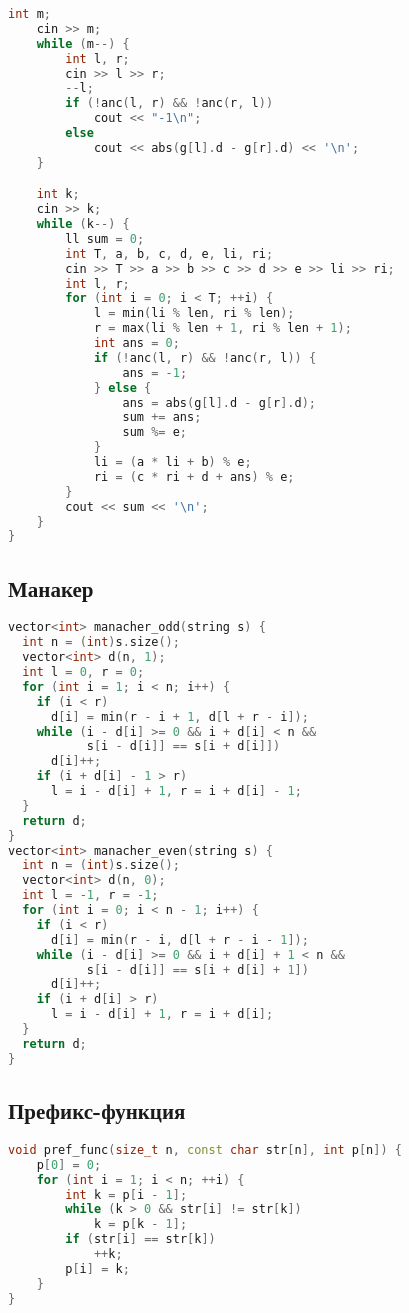 \documentclass[10pt,a4paper,landscape,twosided]{extarticle}
\begin{document}
\begin{multicols}{3}
\begin{lstlisting}[language=C++]
    int m;
    cin >> m;
    while (m--) {
        int l, r;
        cin >> l >> r;
        --l;
        if (!anc(l, r) && !anc(r, l))
            cout << "-1\n";
        else
            cout << abs(g[l].d - g[r].d) << '\n';
    }

    int k;
    cin >> k;
    while (k--) {
        ll sum = 0;
        int T, a, b, c, d, e, li, ri;
        cin >> T >> a >> b >> c >> d >> e >> li >> ri;
        int l, r;
        for (int i = 0; i < T; ++i) {
            l = min(li % len, ri % len);
            r = max(li % len + 1, ri % len + 1);
            int ans = 0;
            if (!anc(l, r) && !anc(r, l)) {
                ans = -1;
            } else {
                ans = abs(g[l].d - g[r].d);
                sum += ans;
                sum %= e;
            }
            li = (a * li + b) % e;
            ri = (c * ri + d + ans) % e;
        }
        cout << sum << '\n';
    }
}
\end{lstlisting}

\subsection{Манакер}
\begin{lstlisting}[language=C++]
vector<int> manacher_odd(string s) {
  int n = (int)s.size();
  vector<int> d(n, 1);
  int l = 0, r = 0;
  for (int i = 1; i < n; i++) {
    if (i < r)
      d[i] = min(r - i + 1, d[l + r - i]);
    while (i - d[i] >= 0 && i + d[i] < n &&
           s[i - d[i]] == s[i + d[i]])
      d[i]++;
    if (i + d[i] - 1 > r)
      l = i - d[i] + 1, r = i + d[i] - 1;
  }
  return d;
}
vector<int> manacher_even(string s) {
  int n = (int)s.size();
  vector<int> d(n, 0);
  int l = -1, r = -1;
  for (int i = 0; i < n - 1; i++) {
    if (i < r)
      d[i] = min(r - i, d[l + r - i - 1]);
    while (i - d[i] >= 0 && i + d[i] + 1 < n &&
           s[i - d[i]] == s[i + d[i] + 1])
      d[i]++;
    if (i + d[i] > r)
      l = i - d[i] + 1, r = i + d[i];
  }
  return d;
}
\end{lstlisting}

\subsection{Префикс-функция}
\begin{lstlisting}[language=C++]
void pref_func(size_t n, const char str[n], int p[n]) {
    p[0] = 0;
    for (int i = 1; i < n; ++i) {
        int k = p[i - 1];
        while (k > 0 && str[i] != str[k])
            k = p[k - 1];
        if (str[i] == str[k])
            ++k;
        p[i] = k;
    }
}
\end{lstlisting}


\end{multicols}
\end{document}

